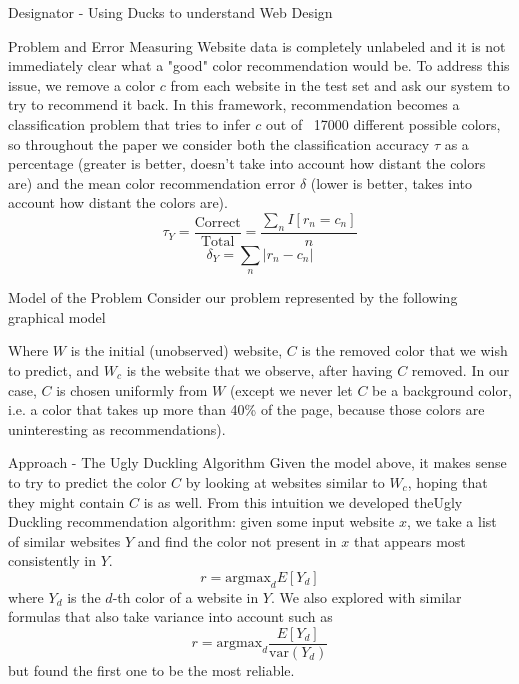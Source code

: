 \documentclass{beamer}
\begin{document}
\begin{frame}{\centerline{\Huge Designator - Using Ducks to understand Web Design}}
\begin{textblock}{5}
\begin{block}{Problem and Error Measuring}
Website data is completely unlabeled and it is not immediately clear what a "good" color recommendation would be. To address this issue, we remove a color $c$ from each website in the test set and ask our system to try to recommend it back. In this framework, recommendation becomes a classification problem that tries to infer $c$ out of ~17000 different possible colors, so throughout the paper we consider both the classification accuracy $\tau$ as a percentage (greater is better, doesn't take into account how distant the colors are) and the mean color recommendation error $\delta$ (lower is better, takes into account how distant the colors are).
$$\tau_Y = \frac{\text{Correct}}{\text{Total}} = \frac{\sum_n I[r_n = c_n]}{n}$$
$$\delta_Y = \sum_n |r_n - c_n|$$
\end{block}

\begin{block}{Model of the Problem}
Consider our problem represented by the following graphical model
\begin{figure}
\centering
{}
\end{figure}
Where $W$ is the initial (unobserved) website, $C$ is the removed color that we wish to predict, and $W_c$ is the website
that we observe, after having $C$ removed. In our case, $C$ is chosen uniformly from $W$ (except we never let $C$ be a
background color, i.e. a color that takes up more than 40\% of the page, because those colors are uninteresting as
recommendations).
\end{block}


\begin{block}{Approach - The Ugly Duckling Algorithm}
Given the model above, it makes sense to try to predict the color $C$ by looking at websites similar to $W_c$, hoping
that they might contain $C$ is as well. From this intuition we developed theUgly Duckling recommendation algorithm: given some input website $x$, we take a list of similar websites $Y$ and find the color not present in $x$ that appears most consistently in $Y$.
$$r = \text{argmax}_{d} E[Y_d] $$
where $Y_d$ is the $d$-th color of a website in $Y$. We also explored with similar formulas that also take variance into account such as
$$r = \text{argmax}_{d} \frac{E\left[Y_d\right]}{\text{var}(Y_d)} $$
but found the first one to be the most reliable.


\end{block}
\end{textblock}
\end{frame}
\end{document}
